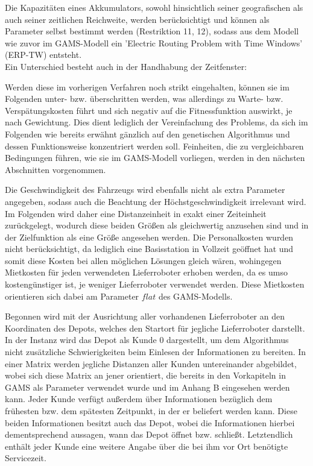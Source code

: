 \documentclass[a4paper,12pt,parskip,bibtotoc,liststotoc]{article}
\begin{document}
Die Kapazitäten eines Akkumulators, sowohl hinsichtlich seiner geografischen als auch seiner zeitlichen Reichweite, werden berücksichtigt und können als Parameter selbst bestimmt werden (Restriktion 11, 12), sodass aus dem Modell wie zuvor im GAMS-Modell ein 'Electric Routing Problem with Time Windows' (ERP-TW) entsteht.\\

Ein Unterschied besteht auch in der Handhabung der Zeitfenster:

Werden diese im vorherigen Verfahren noch strikt eingehalten, können sie im Folgenden unter- bzw. überschritten werden, was allerdings zu Warte- bzw. Verspätungskosten führt und sich negativ auf die Fitnessfunktion auswirkt, je nach Gewichtung.
Dies dient lediglich der Vereinfachung des Problems, da sich im Folgenden wie bereits erwähnt gänzlich auf den genetischen Algorithmus und dessen Funktionsweise konzentriert werden soll. 
Feinheiten, die zu vergleichbaren Bedingungen führen, wie sie im GAMS-Modell vorliegen, werden in den nächsten Abschnitten vorgenommen. 

Die Geschwindigkeit des Fahrzeugs wird ebenfalls nicht als extra Parameter angegeben, sodass auch die Beachtung der Höchstgeschwindigkeit irrelevant wird.
Im Folgenden wird daher eine Distanzeinheit in exakt einer Zeiteinheit zurückgelegt, wodurch diese beiden Größen als gleichwertig anzusehen sind und in der Zielfunktion als eine Größe angesehen werden.
Die Personalkosten wurden nicht berücksichtigt, da lediglich eine Basisstation in Vollzeit geöffnet hat und somit diese Kosten bei allen möglichen Lösungen gleich wären, wohingegen Mietkosten für jeden verwendeten Lieferroboter erhoben werden, da es umso kostengünstiger ist, je weniger Lieferroboter verwendet werden.
Diese Mietkosten orientieren sich dabei am Parameter $flat$ des GAMS-Modells.

Begonnen wird mit der Ausrichtung aller vorhandenen Lieferroboter an den Koordinaten des Depots, welches den Startort für jegliche Lieferroboter darstellt.
In der Instanz wird das Depot als Kunde 0 dargestellt, um dem Algorithmus nicht zusätzliche Schwierigkeiten beim Einlesen der Informationen zu bereiten.
In einer Matrix werden jegliche Distanzen aller Kunden untereinander abgebildet, wobei sich diese Matrix an jener orientiert, die bereits in den Vorkapiteln in GAMS als Parameter verwendet wurde und im Anhang B eingesehen werden kann.
Jeder Kunde verfügt außerdem über Informationen bezüglich dem frühesten bzw. dem spätesten Zeitpunkt, in der er beliefert werden kann.
Diese beiden Informationen besitzt auch das Depot, wobei die Informationen hierbei dementsprechend aussagen, wann das Depot öffnet bzw. schließt.
Letztendlich enthält jeder Kunde eine weitere Angabe über die bei ihm vor Ort benötigte Servicezeit.
\end{document}
